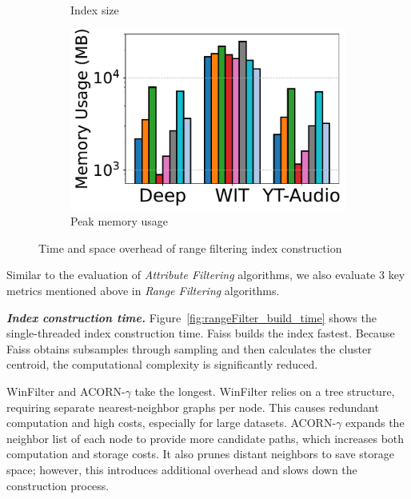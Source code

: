 \documentclass[sigconf, nonacm]{acmart}
\begin{document}
\begin{figure}[t]
\begin{subfigure}[t]{0.32\columnwidth}
			\caption{Index size}
			\label{fig:rangeFilter_ndex_size_mb}
		\end{subfigure}
		\hfill
		\begin{subfigure}[t]{0.32\columnwidth}
			\centering
			\includegraphics[width=\linewidth]{figures/indexData/rangeFilter_memory_mb_comparison_query.pdf}
			\caption{Peak memory usage}
			\label{fig:rangeFilter_memory_mb}
		\end{subfigure}
		
		\caption{Time and space overhead of range filtering index construction}
		\label{fig:rangeFilter_build_index_comparison}
	\end{figure}
	
	Similar to the evaluation of \textit{Attribute Filtering} algorithms, we also evaluate 3 key metrics mentioned above in \textit{Range Filtering} algorithms.
	

	\textit{\textbf{Index construction time.}}
	Figure~\ref{fig:rangeFilter_build_time} shows the single-threaded index construction time. Faiss builds the index fastest. Because Faiss obtains subsamples through sampling and then calculates the cluster centroid, the computational complexity is significantly reduced.
	
	WinFilter and ACORN-\(\gamma\) take the longest.
	WinFilter relies on a tree structure, requiring separate nearest-neighbor graphs per node. This causes redundant computation and high costs, especially for large datasets.
	ACORN-\(\gamma\) expands the neighbor list of each node to provide more candidate paths, which increases both computation and storage costs. It also prunes distant neighbors to save storage space; however, this introduces additional overhead and slows down the construction process.
\end{document}
